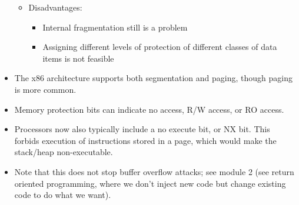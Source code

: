 \documentclass{article}
\begin{document}
\begin{itemize}
\begin{itemize}
\begin{itemize}
                \end{itemize}
            \item Disadvantages:
                \begin{itemize}
                    \item Internal fragmentation still is a problem
                    \item Assigning different levels of protection of different classes of data items is not feasible
                \end{itemize}
        \end{itemize}
    \item The x86 architecture supports both segmentation and paging, though paging is more common.
    \item Memory protection bits can indicate no access, R/W access, or RO access.
    \item Processors now also typically include a no execute bit, or NX bit.  This forbids execution of instructions stored in a page, which would make the stack/heap non-executable.
    \item Note that this does not stop buffer overflow attacks; see module 2 (see return oriented programming, where we don't inject new code but change existing code to do what we want).
\end{itemize}
\end{document}

